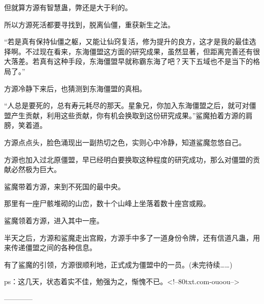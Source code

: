 \begin{this_body}
但就算方源有智慧蛊，弊还是大于利的。

所以方源死活都要寻找到，脱离仙僵，重获新生之法。

“若是真有保持仙僵之躯，又能让仙窍复活，修为提升的良方，这才是我的最佳选择啊。不过现在看来，东海僵盟这方面的研究成果，虽然显著，但距离完善还有很大落差。若真有这种手段，东海僵盟早就称霸东海了吧？天下五域也不是当下的格局了。”

方源冷静下来后，也猜测到东海僵盟的真相。

“人总是要死的，总有寿元耗尽的那天。星象兄，你加入东海僵盟之后，就可对僵盟产生贡献，利用这些贡献，你有机会换取到这份研究成果。”鲨魔拍着方源的肩膀，笑着道。

方源点点头，脸色涌现出一副热切之色，实则心中冷静，知道鲨魔忽悠自己。

方源也加入过北原僵盟，早已经明白要换取这种程度的研究成功，那么对僵盟的贡献必然极为巨大。

鲨魔带着方源，来到不死国的最中央。

那里有一座尸骸堆砌的山峦，数十个山峰上坐落着数十座宫或殿。

鲨魔领着方源，进入其中一座。

半天之后，方源和鲨魔走出宫殿，方源手中多了一道身份令牌，还有信道凡蛊，用来传递僵盟之间的各种信息。

有了鲨魔的引领，方源很顺利地，正式成为僵盟中的一员。(未完待续……)

ps：这几天，状态着实不佳，勉强为之，惭愧不已。<!--80txt.com-ouoou-->

------------

\end{this_body}

